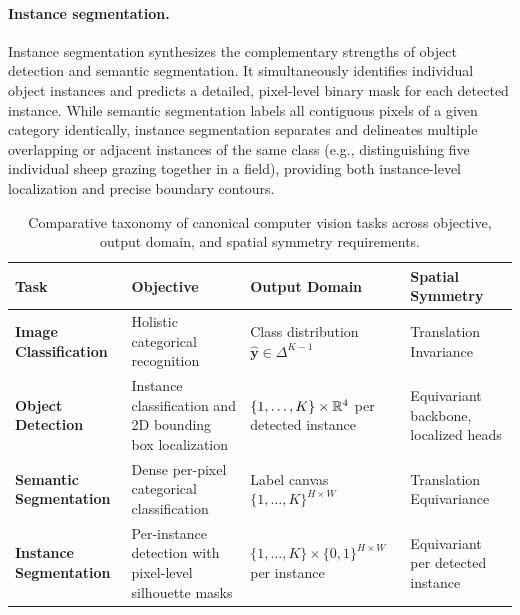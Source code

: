 \paragraph{Instance segmentation.}
Instance segmentation synthesizes the complementary strengths of object detection and semantic segmentation. It simultaneously identifies individual object instances and predicts a detailed, pixel-level binary mask for each detected instance. While semantic segmentation labels all contiguous pixels of a given category identically, instance segmentation separates and delineates multiple overlapping or adjacent instances of the same class (e.g., distinguishing five individual sheep grazing together in a field), providing both instance-level localization and precise boundary contours.

\begin{table}[H]
\centering
\small
\setlength{\tabcolsep}{6pt}
\caption{Comparative taxonomy of canonical computer vision tasks across objective, output domain, and spatial symmetry requirements.}
\label{tab:cv_tasks_comparison}
\vspace{4pt}
\begin{tabularx}{\textwidth}{>{\raggedright\arraybackslash}p{3.2cm} >{\raggedright\arraybackslash}p{4.2cm} >{\raggedright\arraybackslash}p{3.6cm} >{\raggedright\arraybackslash}X}
\toprule
\textbf{Task} & \textbf{Objective} & \textbf{Output Domain} & \textbf{Spatial Symmetry} \\
\midrule
\textbf{Image Classification} & Holistic categorical recognition & Class distribution $\hat{\mathbf{y}} \in \Delta^{K-1}$ & Translation Invariance \\
\addlinespace
\textbf{Object Detection} & Instance classification and 2D bounding box localization & $\{1,\dots,K\} \times \mathbb{R}^4$ per detected instance & Equivariant backbone, localized heads \\
\addlinespace
\textbf{Semantic Segmentation} & Dense per-pixel categorical classification & Label canvas $\{1,\dots,K\}^{H \times W}$ & Translation Equivariance \\
\addlinespace
\textbf{Instance Segmentation} & Per-instance detection with pixel-level silhouette masks & $\{1,\dots,K\} \times \{0,1\}^{H \times W}$ per instance & Equivariant per detected instance \\
\bottomrule
\end{tabularx}
\end{table}
